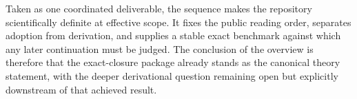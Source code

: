 \documentclass[11pt]{article}
\begin{document}
Taken as one coordinated deliverable, the sequence makes the repository scientifically definite at effective scope. It fixes the public reading order, separates adoption from derivation, and supplies a stable exact benchmark against which any later continuation must be judged. The conclusion of the overview is therefore that the exact-closure package already stands as the canonical theory statement, with the deeper derivational question remaining open but explicitly downstream of that achieved result.


\end{document}
